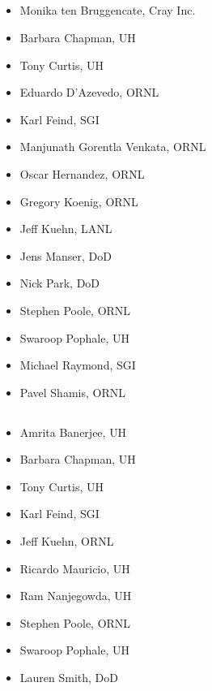 \subsection*{}
\begin{multicols}{2}
\begin{itemize}
\setlength\itemsep{0.1em}
\item Monika ten Bruggencate, Cray Inc.
\item Barbara Chapman, \ac{UH}
\item Tony Curtis, \ac{UH}
\item Eduardo D’Azevedo, \ac{ORNL}
\item Karl Feind, \ac{SGI}
\item Manjunath Gorentla Venkata, \ac{ORNL}
\item Oscar Hernandez, \ac{ORNL}
\item Gregory Koenig, \ac{ORNL}
\item Jeff Kuehn, \ac{LANL}
\item Jens Manser, \ac{DoD}
\item Nick Park, \ac{DoD}
\item Stephen Poole, \ac{ORNL}
\item Swaroop Pophale, \ac{UH}
\item Michael Raymond, \ac{SGI}
\item Pavel Shamis, \ac{ORNL}
\end{itemize}
\end{multicols}

\subsection*{}
\begin{multicols}{2}
\begin{itemize}
\setlength\itemsep{0.1em}
\item Amrita Banerjee, \ac{UH}
\item Barbara Chapman, \ac{UH}
\item Tony Curtis, \ac{UH}
\item Karl Feind, \ac{SGI}
\item Jeff Kuehn, \ac{ORNL}
\item Ricardo Mauricio, \ac{UH}
\item Ram Nanjegowda, \ac{UH}
\item Stephen Poole, \ac{ORNL}
\item Swaroop Pophale, \ac{UH}
\item Lauren Smith, \ac{DoD}
\end{itemize}
\end{multicols}

